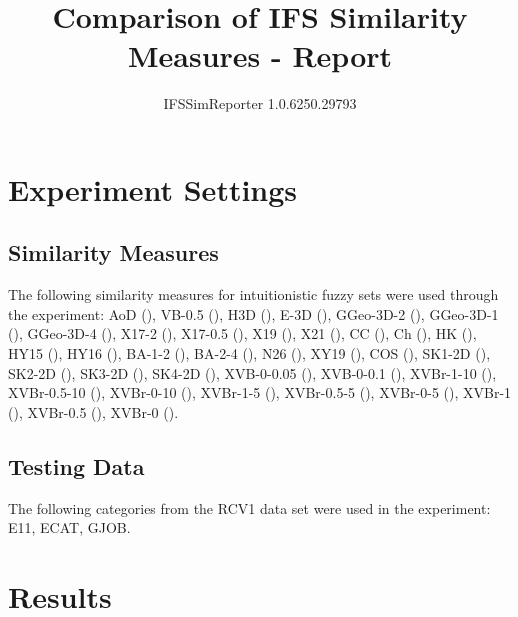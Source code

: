 \documentclass[a4paper,10pt]{article}
\title{Comparison of IFS Similarity Measures - Report}
\author{IFSSimReporter 1.0.6250.29793}
\begin{document}
 \maketitle
\section{Experiment Settings}
\subsection{Similarity Measures}
The following similarity measures for intuitionistic fuzzy sets were used through the experiment: 
AoD (\cite{Loor2017}), VB-0.5 (\cite{Loor2013}), H3D (\cite{Szmidt2000}), E-3D (\cite{Szmidt2000}), GGeo-3D-2 (\cite{Xu2007}), GGeo-3D-1 (\cite{Xu2007}), GGeo-3D-4 (\cite{Xu2007}), X17-2 (\cite{Xu2007}), X17-0.5 (\cite{Xu2007}), X19 (\cite{Xu2007}), X21 (\cite{Xu2007}), CC (\cite{Chen2016}), Ch (\cite{Chen1997}), HK (\cite{Hong1999}), HY15 (\cite{Hung2004}), HY16 (\cite{Hung2004}), BA-1-2 (\cite{Boran2014}), BA-2-4 (\cite{Boran2014}), N26 (\cite{Nguyen2016}), XY19 (\cite{Xu2009}), COS (\cite{Szmidt2013}), SK1-2D (\cite{Szmidt2004}), SK2-2D (\cite{Szmidt2004}), SK3-2D (\cite{Szmidt2004}), SK4-2D (\cite{Szmidt2004}), XVB-0-0.05 (\cite{Loor2017}), XVB-0-0.1 (\cite{Loor2017}), XVBr-1-10 (\cite{Loor2017}), XVBr-0.5-10 (\cite{Loor2017}), XVBr-0-10 (\cite{Loor2017}), XVBr-1-5 (\cite{Loor2017}), XVBr-0.5-5 (\cite{Loor2017}), XVBr-0-5 (\cite{Loor2017}), XVBr-1 (\cite{Loor2017}), XVBr-0.5 (\cite{Loor2017}), XVBr-0 (\cite{Loor2017}).
\subsection{Testing Data}
The following categories from the RCV1 data set were used in the experiment: 
E11, ECAT, GJOB.
\pagebreak
\section{Results}

\pagebreak
\end{document}
